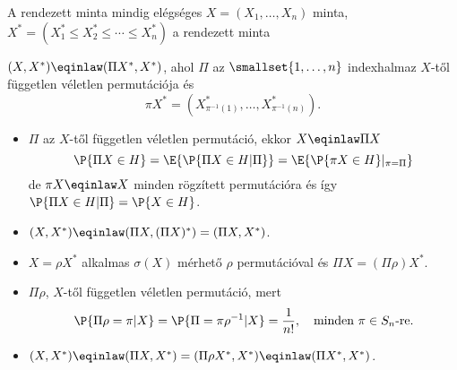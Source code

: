 \documentclass[aspectratio=169,notheorems,9pt,\option]{beamer}
\begin{document}
\begin{frame}{A rendezett minta mindig elégséges}
  $X=(X_1,\dots,X_n)$ minta, $X^*=(X_1^*\leq X_2^*\leq\cdots\leq X_n^*)$ a rendezett minta

  \begin{proposition}
    $(X,X^*)\eqinlaw(\Pi X^*,X^*)$, ahol $\Pi$ az $\smallset{1,\dots,n}$ indexhalmaz 
    $X$-től független véletlen permutációja és 
    \begin{displaymath}
      \pi X^*=(X^*_{\pi^{-1}(1)},\dots,X^*_{\pi^{-1}(n)}).
    \end{displaymath}
  \end{proposition}
  
  \begin{itemize}
    \item $\Pi$ az $X$-től független véletlen permutáció, ekkor $X\eqinlaw \Pi X$
    \begin{displaymath}
      \P{\Pi X\in H}=\E{\P{\Pi X\in H|\Pi}}=\E{\P{\pi X\in H}|_{\pi=\Pi}}
    \end{displaymath} 
    de $\pi X\eqinlaw X$ minden rögzített permutációra és így $\P{\Pi X\in H|\Pi}=\P{X\in H}$.
    \item $(X,X^*)\eqinlaw (\Pi X,(\Pi X)^*)=(\Pi X,X^*)$.
    \item $X=\rho X^*$ alkalmas $\sigma(X)$ mérhető $\rho$ permutációval és 
    $\Pi X=(\Pi\rho) X^*$.
    \item $\Pi\rho$, $X$-től független véletlen permutáció, mert 
    \begin{displaymath}
      \P{\Pi\rho=\pi|X}=\P{\Pi=\pi\rho^{-1}|X}=\frac1{n!},
      \quad\text{minden $\pi\in S_n$-re}. 
    \end{displaymath}
    \item $(X,X^*)\eqinlaw(\Pi X,X^*)=(\Pi\rho X^*,X^*)\eqinlaw(\Pi X^*,X^*)$.
  \end{itemize}
\end{frame}


\end{document}
